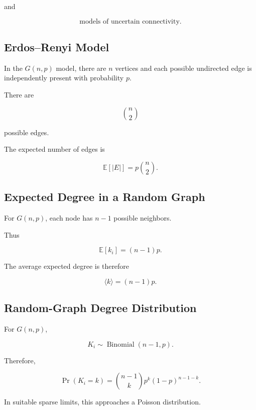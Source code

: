 and

\[
\boxed{
\text{models of uncertain connectivity}.
}
\]

\subsection{Erdos--Renyi Model}
\label{subsec:erdos-renyi-network}

In the \(G(n,p)\) model, there are \(n\) vertices and each possible
undirected edge is independently present with probability \(p\).

There are

\[
\binom n2
\]

possible edges.

The expected number of edges is

\[
\boxed{
\mathbb{E}[|E|]
=
p\binom n2.
}
\]

\subsection{Expected Degree in a Random Graph}
\label{subsec:random-graph-expected-degree}

For \(G(n,p)\), each node has \(n-1\) possible neighbors.

Thus

\[
\boxed{
\mathbb{E}[k_i]
=
(n-1)p.
}
\]

The average expected degree is therefore

\[
\boxed{
\langle k\rangle
=
(n-1)p.
}
\]

\subsection{Random-Graph Degree Distribution}
\label{subsec:random-graph-degree-distribution}

For \(G(n,p)\),

\[
\boxed{
K_i
\sim
\operatorname{Binomial}(n-1,p).
}
\]

Therefore,

\[
\boxed{
\Pr(K_i=k)
=
\binom{n-1}{k}
p^k
(1-p)^{n-1-k}.
}
\]

In suitable sparse limits, this approaches a Poisson distribution.

